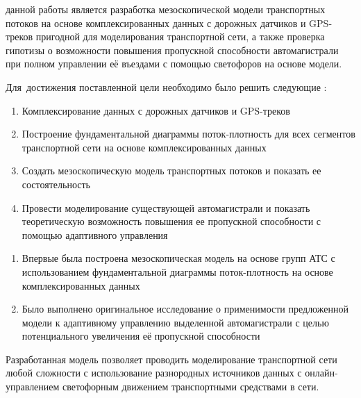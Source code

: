 \ifsynopsis

\else

\fi


{\aim} данной работы является разработка мезоскопической модели транспортных потоков на основе комплексированных данных с дорожных датчиков и GPS-треков пригодной для моделирования транспортной сети, а также проверка гипотизы о возможности повышения пропускной способности автомагистрали при полном управлении её въездами с помощью светофоров на основе модели.

Для~достижения поставленной цели необходимо было решить следующие {\tasks}:
\begin{enumerate}[beginpenalty=10000] %
  \item Комплексирование данных с дорожных датчиков и GPS-треков
  \item Построение фундаментальной диаграммы поток-плотность для всех сегментов транспортной сети на основе комплексированных данных
  \item Создать мезоскопическую модель транспортных потоков и показать ее состоятельность
  \item Провести моделирование существующей автомагистрали и показать теоретическую возможность повышения ее пропускной способности с помощью адаптивного управления
\end{enumerate}


{\novelty}
\begin{enumerate}[beginpenalty=10000] %
  \item Впервые была построена мезоскопическая модель на основе групп АТС с использованием фундаментальной диаграммы поток-плотность на основе комплексированных данных
  \item Было выполнено оригинальное исследование о применимости предложенной модели к адаптивному управлению выделенной автомагистрали с целью потенциального увеличения её пропускной способности
\end{enumerate}

{\influence} Разработанная модель позволяет проводить моделирование транспортной сети любой сложности с использование разнородных источников данных с онлайн-управлением светофорным движением транспортными средствами в сети. 

